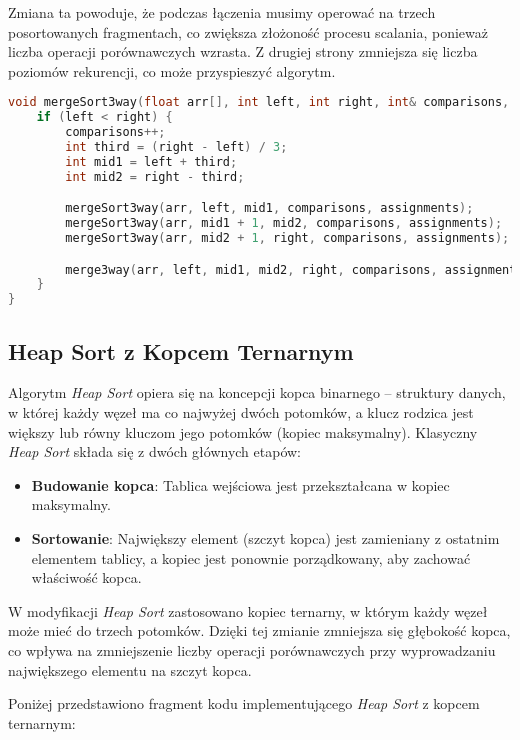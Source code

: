 \documentclass[a4paper,12pt]{article}
\begin{document}
Zmiana ta powoduje, że podczas łączenia musimy operować na trzech posortowanych fragmentach, co zwiększa złożoność procesu scalania, ponieważ liczba operacji porównawczych wzrasta. Z drugiej strony zmniejsza się liczba poziomów rekurencji, co może przyspieszyć algorytm.
\newpage
\begin{lstlisting}[language=C++,caption=Merge Sort z podziałem na trzy części]
void mergeSort3way(float arr[], int left, int right, int& comparisons, int& assignments) {
    if (left < right) {
        comparisons++;
        int third = (right - left) / 3;
        int mid1 = left + third;
        int mid2 = right - third;

        mergeSort3way(arr, left, mid1, comparisons, assignments);
        mergeSort3way(arr, mid1 + 1, mid2, comparisons, assignments);
        mergeSort3way(arr, mid2 + 1, right, comparisons, assignments);

        merge3way(arr, left, mid1, mid2, right, comparisons, assignments);
    }
}
\end{lstlisting}

\subsection{Heap Sort z Kopcem Ternarnym}
Algorytm \textit{Heap Sort} opiera się na koncepcji kopca binarnego – struktury danych, w której każdy węzeł ma co najwyżej dwóch potomków, a klucz rodzica jest większy lub równy kluczom jego potomków (kopiec maksymalny). Klasyczny \textit{Heap Sort} składa się z dwóch głównych etapów:
\begin{itemize}
    \item \textbf{Budowanie kopca}: Tablica wejściowa jest przekształcana w kopiec maksymalny.
    \item \textbf{Sortowanie}: Największy element (szczyt kopca) jest zamieniany z ostatnim elementem tablicy, a kopiec jest ponownie porządkowany, aby zachować właściwość kopca.
\end{itemize}

W modyfikacji \textit{Heap Sort} zastosowano kopiec ternarny, w którym każdy węzeł może mieć do trzech potomków. Dzięki tej zmianie zmniejsza się głębokość kopca, co wpływa na zmniejszenie liczby operacji porównawczych przy wyprowadzaniu największego elementu na szczyt kopca. 

\newpage
Poniżej przedstawiono fragment kodu implementującego \textit{Heap Sort} z kopcem ternarnym:
\end{document}
